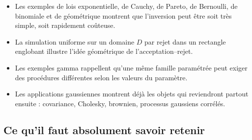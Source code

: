\documentclass[11pt,a4paper]{article}
\begin{document}
\begin{itemize}
  \item Les exemples de lois exponentielle, de Cauchy, de Pareto, de Bernoulli, de binomiale et de géométrique montrent que l'inversion peut être soit très simple, soit rapidement coûteuse.
  \item La simulation uniforme sur un domaine $D$ par rejet dans un rectangle englobant illustre l'idée géométrique de l'acceptation--rejet.
  \item Les exemples gamma rappellent qu'une même famille paramétrée peut exiger des procédures différentes selon les valeurs du paramètre.
  \item Les applications gaussiennes montrent déjà les objets qui reviendront partout ensuite : covariance, Cholesky, brownien, processus gaussiens corrélés.
\end{itemize}

\subsection{Ce qu'il faut absolument savoir retenir}
\end{document}
